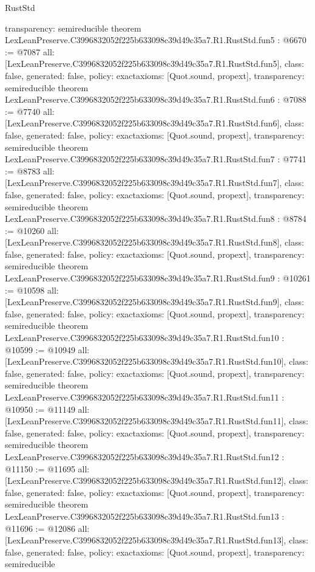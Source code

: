 \begin{lexlean}{RustStd}
\begin{coremodule}
{  transparency: semireducible
}
theorem LexLeanPreserve.C3996832052f225b633098c39d49c35a7.R1.RustStd.fun5 : @6670 := @7087 {
  all: [LexLeanPreserve.C3996832052f225b633098c39d49c35a7.R1.RustStd.fun5],
  class: false,
  generated: false,
  policy: exact{axioms: [Quot.sound, propext]},
  transparency: semireducible
}
theorem LexLeanPreserve.C3996832052f225b633098c39d49c35a7.R1.RustStd.fun6 : @7088 := @7740 {
  all: [LexLeanPreserve.C3996832052f225b633098c39d49c35a7.R1.RustStd.fun6],
  class: false,
  generated: false,
  policy: exact{axioms: [Quot.sound, propext]},
  transparency: semireducible
}
theorem LexLeanPreserve.C3996832052f225b633098c39d49c35a7.R1.RustStd.fun7 : @7741 := @8783 {
  all: [LexLeanPreserve.C3996832052f225b633098c39d49c35a7.R1.RustStd.fun7],
  class: false,
  generated: false,
  policy: exact{axioms: [Quot.sound, propext]},
  transparency: semireducible
}
theorem LexLeanPreserve.C3996832052f225b633098c39d49c35a7.R1.RustStd.fun8 : @8784 := @10260 {
  all: [LexLeanPreserve.C3996832052f225b633098c39d49c35a7.R1.RustStd.fun8],
  class: false,
  generated: false,
  policy: exact{axioms: [Quot.sound, propext]},
  transparency: semireducible
}
theorem LexLeanPreserve.C3996832052f225b633098c39d49c35a7.R1.RustStd.fun9 : @10261 := @10598 {
  all: [LexLeanPreserve.C3996832052f225b633098c39d49c35a7.R1.RustStd.fun9],
  class: false,
  generated: false,
  policy: exact{axioms: [Quot.sound, propext]},
  transparency: semireducible
}
theorem LexLeanPreserve.C3996832052f225b633098c39d49c35a7.R1.RustStd.fun10 : @10599 := @10949 {
  all: [LexLeanPreserve.C3996832052f225b633098c39d49c35a7.R1.RustStd.fun10],
  class: false,
  generated: false,
  policy: exact{axioms: [Quot.sound, propext]},
  transparency: semireducible
}
theorem LexLeanPreserve.C3996832052f225b633098c39d49c35a7.R1.RustStd.fun11 : @10950 := @11149 {
  all: [LexLeanPreserve.C3996832052f225b633098c39d49c35a7.R1.RustStd.fun11],
  class: false,
  generated: false,
  policy: exact{axioms: [Quot.sound, propext]},
  transparency: semireducible
}
theorem LexLeanPreserve.C3996832052f225b633098c39d49c35a7.R1.RustStd.fun12 : @11150 := @11695 {
  all: [LexLeanPreserve.C3996832052f225b633098c39d49c35a7.R1.RustStd.fun12],
  class: false,
  generated: false,
  policy: exact{axioms: [Quot.sound, propext]},
  transparency: semireducible
}
theorem LexLeanPreserve.C3996832052f225b633098c39d49c35a7.R1.RustStd.fun13 : @11696 := @12086 {
  all: [LexLeanPreserve.C3996832052f225b633098c39d49c35a7.R1.RustStd.fun13],
  class: false,
  generated: false,
  policy: exact{axioms: [Quot.sound, propext]},
  transparency: semireducible
}
\end{coremodule}
\end{lexlean}
